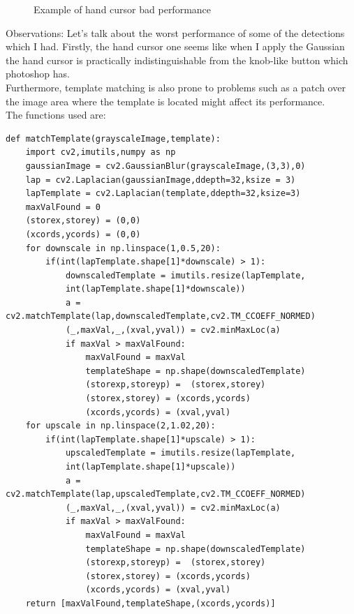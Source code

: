 \documentclass[12pt]{article}
\newenvironment{QandA}
{
	\begin{enumerate}[label=\normalfont\arabic*.,leftmargin=2em,rightmargin=2em]\normalfont
	}
	{
	\end{enumerate}
}
\newenvironment{codelalala}{}{}
\newenvironment{answered}{\setlength{\parindent}{1em}\par\normalfont}{}
\begin{document}
\begin{QandA}
\begin{answered}
\begin{figure}
  			\caption{Example of hand cursor bad performance}
  		\label{hand-cur-bad}
\end{figure}
Observations:
Let's talk about the worst performance of some of the detections which I had. Firstly, the hand cursor one seems like when I apply the Gaussian the hand cursor is practically indistinguishable from the knob-like button which photoshop has.
\\
Furthermore, template matching is also prone to problems such as a patch over the image area where the template is located might affect its performance. 
\\
The functions used are:
\begin{codelalala}
\begin{verbatim}
def matchTemplate(grayscaleImage,template):
    import cv2,imutils,numpy as np
    gaussianImage = cv2.GaussianBlur(grayscaleImage,(3,3),0)
    lap = cv2.Laplacian(gaussianImage,ddepth=32,ksize = 3)
    lapTemplate = cv2.Laplacian(template,ddepth=32,ksize=3)
    maxValFound = 0
    (storex,storey) = (0,0)
    (xcords,ycords) = (0,0)
    for downscale in np.linspace(1,0.5,20):
        if(int(lapTemplate.shape[1]*downscale) > 1):
            downscaledTemplate = imutils.resize(lapTemplate,
            int(lapTemplate.shape[1]*downscale))        
            a = cv2.matchTemplate(lap,downscaledTemplate,cv2.TM_CCOEFF_NORMED)
            (_,maxVal,_,(xval,yval)) = cv2.minMaxLoc(a)
            if maxVal > maxValFound:
                maxValFound = maxVal
                templateShape = np.shape(downscaledTemplate)
                (storexp,storeyp) =  (storex,storey)
                (storex,storey) = (xcords,ycords)
                (xcords,ycords) = (xval,yval)
    for upscale in np.linspace(2,1.02,20):
        if(int(lapTemplate.shape[1]*upscale) > 1):
            upscaledTemplate = imutils.resize(lapTemplate,
            int(lapTemplate.shape[1]*upscale))
            a = cv2.matchTemplate(lap,upscaledTemplate,cv2.TM_CCOEFF_NORMED)
            (_,maxVal,_,(xval,yval)) = cv2.minMaxLoc(a)
            if maxVal > maxValFound:
                maxValFound = maxVal
                templateShape = np.shape(downscaledTemplate)
                (storexp,storeyp) =  (storex,storey)
                (storex,storey) = (xcords,ycords)
                (xcords,ycords) = (xval,yval)
    return [maxValFound,templateShape,(xcords,ycords)]
\end{verbatim}
\end{codelalala}
\end{answered}
\end{QandA}
\end{document}
